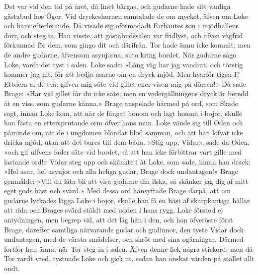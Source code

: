 Det var vid den tid på året, då linet bärgas, och gudarne hade sitt
vanliga gästabud hos Öger. Vid dryckeshornen samtalade de om mycket,
äfven om Loke och hans efterletande. Då visade sig oförmodadt Farbautes
son i mjödhallens dörr, och steg in. Han visste, att gästabudssalen var
fridlyst, och äfven vägfrid förkunnad för dem, som gingo dit och
därifrån. Tor hade ännu icke kommit; men de andre gudarne, äfvensom
asynjorna, suto kring bordet. När gudarne sågo Loke, vardt det tyst i
salen. Loke sade: »Lång väg har jag vandrat, och törstig kommer jag hit,
för att bedja asarne om en dryck mjöd. Men hvarför tigen I? Ettdera af
de två: gifven mig säte vid gillet eller visen mig på dörren!» Då sade
Brage: »Här vid gillet får du icke säte; men en vedergällningens dryck
är beredd åt en viss, som gudarne känna.» Brage anspelade härmed på ord,
som Skade sagt, innan Loke kom, att när de fångat honom och lagt honom i
bojor, skulle hon fästa en ettersprutande orm öfver hans mun. Loke vände
sig till Oden och påminde om, att de i ungdomen blandat blod samman, och
att han lofvat icke dricka mjöd, utan att det bures till dem båda. »Stig
upp, Vidar», sade då Oden, »och gif ulfvens fader säte vid bordet, så
att han icke förbittrar vårt gille med lastande ord!» Vidar steg upp och
skänkte i åt Loke, som sade, innan han drack: »Hel asar, hel asynjor och
alla heliga gudar, Brage dock undantagen!» Brage genmälde: »Vill du låta
bli att visa gudarne din ilska, så skänker jag dig af mitt eget gods
häst och svärd.» Med dessa ord hänsyftade Brage därpå, att om gudarne
lyckades lägga Loke i bojor, skulle han få en häst af skarpkantiga
hällar att rida och Brages svärd stäldt med udden i hans rygg. Loke
förstod ej antydningen, men begrep väl, att det låg hån i den, och han
öfveröste först Brage, därefter
samtliga
närvarande gudar och gudinnor, den tyste Vidar dock undantagen, med de
värsta smädelser, och skröt med sina ogärningar. Därmed fortfor han
ännu, när Tor steg in i salen. Äfven denne fick några stickord; men då
Tor vardt vred, tystnade Loke och gick ut, sedan han önskat värden på
stället allt ondt.

